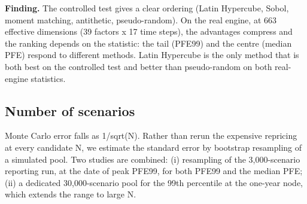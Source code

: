 \documentclass[11pt,letterpaper]{article}
\begin{document}
\textbf{Finding.} The controlled test gives a clear ordering (Latin Hypercube, Sobol, moment matching, antithetic, pseudo-random). On the real engine, at 663 effective dimensions (39 factors x 17 time steps), the advantages compress and the ranking depends on the statistic: the tail (PFE99) and the centre (median PFE) respond to different methods. Latin Hypercube is the only method that is both best on the controlled test and better than pseudo-random on both real-engine statistics.

\begin{center}\end{center}
\clearpage
\subsection{Number of scenarios}
Monte Carlo error falls as 1/sqrt(N). Rather than rerun the expensive repricing at every candidate N, we estimate the standard error by bootstrap resampling of a simulated pool. Two studies are combined: (i) resampling of the 3,000-scenario reporting run, at the date of peak PFE99, for both PFE99 and the median PFE; (ii) a dedicated 30,000-scenario pool for the 99th percentile at the one-year node, which extends the range to large N.
\end{document}
